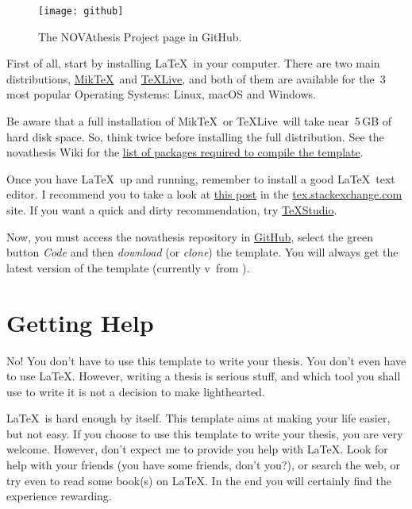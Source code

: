 \newcommand{\MikTeX}{Mik\TeX}
\newcommand{\TeXLive}{\TeX Live}
\newcommand{\pdfLaTeX}{pdf\LaTeX}


\begin{figure}
\vspace*{-17ex}
\texttt{[image: github]}%
\caption{The NOVAthesis Project page in GitHub.}
\label{fig:github2}
\end{figure}

First of all, start by installing \LaTeX\ in your computer.  There are two main distributions, \href{https://miktex.org}{\MikTeX}\ and \href{https://www.tug.org/texlive/}{\TeXLive}, and both of them are available for the~3 most popular Operating Systems: Linux, macOS and Windows.

Be aware that a full installation of \MikTeX\ or \TeXLive\ will take near~5\,GB of hard disk space.  So, think twice before installing the full distribution.  See the \gls{novathesis} Wiki for the \href{https://github.com/joaomlourenco/novathesis/wiki/installing-latex#minimal-installation-in-any-of-the-systems-above}{list of packages required to compile the template}.

Once you have \LaTeX\ up and running, remember to install a good \LaTeX\ text editor.  I recommend you to take a look at  \href{https://tex.stackexchange.com/questions/339/latex-editors-ides}{this post} in the \url{tex.stackexchange.com} site.  If you want a quick and dirty recommendation, try \href{https://www.texstudio.org/}{TeXStudio}.

Now, you must access the \gls{novathesis} repository in \href{https://github.com/joaomlourenco/novathesis}{GitHub}, select the green button \emph{Code} and then \emph{download} (or \emph{clone}) the template.  You will always get the latest version of the template (currently v\novathesisversion\ from \novathesisdate).


\section{Getting Help}
\label{sec:getting_help}

No! You don't have to use this template to write your thesis.  You don't even have to use \LaTeX.  However, writing a thesis is serious stuff, and which tool you shall use to write it is not a decision to make lighthearted.

\LaTeX\ is hard enough by itself.  This template aims at making your life easier, but not easy. If you choose to use this template to write your thesis, you are very welcome.  However, don't expect me to provide you help with \LaTeX.  Look for help with your friends (you have some friends, don't you?), or search the web, or try even to read some book(s) on \LaTeX. In the end you will certainly find the experience rewarding.

